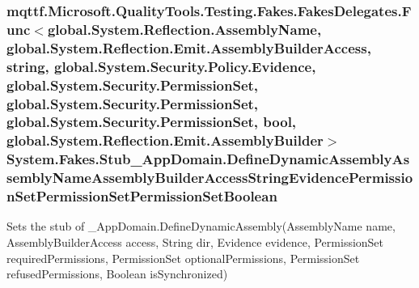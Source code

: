 \hypertarget{class_system_1_1_fakes_1_1_stub___app_domain_a617e2ad26aa95aea63264f20e3f4c41e}{
\subsubsection[{Define\-Dynamic\-Assembly\-Assembly\-Name\-Assembly\-Builder\-Access\-String\-Evidence\-Permission\-Set\-Permission\-Set\-Permission\-Set\-Boolean}]{\setlength{\rightskip}{0pt plus 5cm}mqttf.\-Microsoft.\-Quality\-Tools.\-Testing.\-Fakes.\-Fakes\-Delegates.\-Func$<$global.\-System.\-Reflection.\-Assembly\-Name, global.\-System.\-Reflection.\-Emit.\-Assembly\-Builder\-Access, string, global.\-System.\-Security.\-Policy.\-Evidence, global.\-System.\-Security.\-Permission\-Set, global.\-System.\-Security.\-Permission\-Set, global.\-System.\-Security.\-Permission\-Set, bool, global.\-System.\-Reflection.\-Emit.\-Assembly\-Builder$>$ System.\-Fakes.\-Stub\-\_\-\-App\-Domain.\-Define\-Dynamic\-Assembly\-Assembly\-Name\-Assembly\-Builder\-Access\-String\-Evidence\-Permission\-Set\-Permission\-Set\-Permission\-Set\-Boolean}}\label{class_system_1_1_fakes_1_1_stub___app_domain_a617e2ad26aa95aea63264f20e3f4c41e}


Sets the stub of \-\_\-\-App\-Domain.\-Define\-Dynamic\-Assembly(\-Assembly\-Name name, Assembly\-Builder\-Access access, String dir, Evidence evidence, Permission\-Set required\-Permissions, Permission\-Set optional\-Permissions, Permission\-Set refused\-Permissions, Boolean is\-Synchronized)

